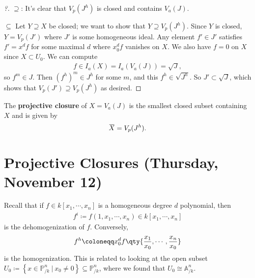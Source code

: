 \begin{proof}[?]

\(\supseteq\): It's clear that \(V_p(J^h)\) is closed and contains
\(V_a(J)\).

\(\subseteq\) Let \(Y\supseteq X\) be closed; we want to show that
\(Y\supseteq V_p(J^h)\). Since \(Y\) is closed, \(Y = V_p(J')\) where
\(J'\) is some homogeneous ideal. Any element \(f'\in J'\) satisfies
\(f' = x^d f\) for some maximal \(d\) where \(x_0^d f\) vanishes on
\(X\). We also have \(f=0\) on \(X\) since \(X\subset U_0\). We can
compute
\begin{align*}  
f\in I_a(X) = I_a(V_a(J)) = \sqrt J
,\end{align*}
so \(f^m\in J\). Then \((f^h)^m \in J^h\) for some \(m\), and this
\(f^h \in \sqrt{J^h}\). So \(J'\subset \sqrt J\), which shows that
\(V_p(J') \supseteq V_p(J^h)\) as desired.

\end{proof}

\begin{definition}

The \textbf{projective closure} of \(X = V_a(J)\) is the smallest closed
subset containing \(X\) and is given by
\begin{align*}  
\mkern 1.5mu\overline{\mkern-1.5muX\mkern-1.5mu}\mkern 1.5mu = V_p(J^h)
.\end{align*}

\end{definition}

\hypertarget{projective-closures-thursday-november-12}{%
\section{Projective Closures (Thursday, November
12)}\label{projective-closures-thursday-november-12}}

Recall that if \(f\in k[x_1, \cdots, x_{n}]\) is a homogeneous degree
\(d\) polynomial, then
\begin{align*}
f^i \coloneqq f(1, x_1, \cdots, x_n) \in k[x_1,\cdots, x_n]
\end{align*}
is the dehomogenization of \(f\). Conversely,
\begin{align*}
f^h \coloneqq x_0^d f\qty{ {x_1 \over x_0}, \cdots, {x_n \over x_0} }
\end{align*}
is the homogenization. This is related to looking at the open subset
\(U_0 \coloneqq\left\{{ x\in {\mathbb{P}}^n_{/k} {~\mathrel{\Big|}~}x_0\neq 0}\right\} \subseteq {\mathbb{P}}^n_{/k}\),
where we found that \(U_0 \cong {\mathbb{A}}^n_{/k}\).

